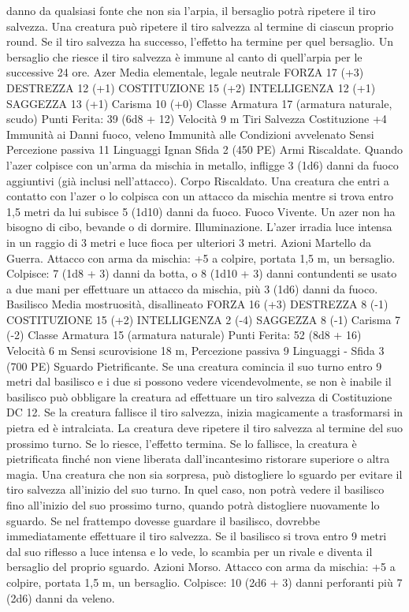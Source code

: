 \begin{multicols}{2}
danno da qualsiasi fonte che non sia l’arpia, il bersaglio potrà
ripetere il tiro salvezza. Una creatura può ripetere il tiro salvezza
al termine di ciascun proprio round. Se il tiro salvezza ha
successo, l’effetto ha termine per quel bersaglio.
Un bersaglio che riesce il tiro salvezza è immune al canto di
quell’arpia per le successive 24 ore.
Azer
Media elementale, legale neutrale
FORZA 17 (+3)
DESTREZZA 12 (+1)
COSTITUZIONE 15 (+2)
INTELLIGENZA 12 (+1)
SAGGEZZA 13 (+1)
Carisma 10 (+0)
Classe Armatura 17 (armatura naturale, scudo)
\hspace*{0pt}\hfill{Punti Ferita}: 39 (6d8 + 12)
Velocità 9 m
Tiri Salvezza Costituzione +4
Immunità ai Danni fuoco, veleno
Immunità alle Condizioni avvelenato
Sensi Percezione passiva 11
Linguaggi Ignan
Sfida 2 (450 PE)
Armi Riscaldate. Quando l’azer colpisce con un’arma da mischia
in metallo, infligge 3 (1d6) danni da fuoco aggiuntivi (già inclusi
nell’attacco).
Corpo Riscaldato. Una creatura che entri a contatto con l’azer o
lo colpisca con un attacco da mischia mentre si trova entro 1,5
metri da lui subisce 5 (1d10) danni da fuoco.
Fuoco Vivente. Un azer non ha bisogno di cibo, bevande o di
dormire.
Illuminazione. L’azer irradia luce intensa in un raggio di 3 metri
e luce fioca per ulteriori 3 metri.
Azioni
Martello da Guerra. Attacco con arma da mischia: +5 a colpire,
portata 1,5 m, un bersaglio.
Colpisce: 7 (1d8 + 3) danni da botta, o 8 (1d10 + 3) danni
contundenti se usato a due mani per effettuare un attacco da
mischia, più 3 (1d6) danni da fuoco.
Basilisco
Media mostruosità, disallineato
FORZA 16 (+3)
DESTREZZA 8 (-1)
COSTITUZIONE 15 (+2)
INTELLIGENZA 2 (-4)
SAGGEZZA 8 (-1)
Carisma 7 (-2)
Classe Armatura 15 (armatura naturale)
\hspace*{0pt}\hfill{Punti Ferita}: 52 (8d8 + 16)
Velocità 6 m
Sensi scurovisione 18 m, Percezione passiva 9
Linguaggi -
Sfida 3 (700 PE)
Sguardo Pietrificante. Se una creatura comincia il suo turno entro 9
metri dal basilisco e i due si possono vedere vicendevolmente, se non
è inabile il basilisco può obbligare la creatura ad effettuare un tiro
salvezza di Costituzione DC 12. Se la creatura fallisce il tiro
salvezza, inizia magicamente a trasformarsi in pietra ed è intralciata.
La creatura deve ripetere il tiro salvezza al termine del suo prossimo
turno. Se lo riesce, l’effetto termina. Se lo fallisce, la creatura è
pietrificata finché non viene liberata dall’incantesimo ristorare
superiore o altra magia.
Una creatura che non sia sorpresa, può distogliere lo sguardo per
evitare il tiro salvezza all’inizio del suo turno. In quel caso, non
potrà vedere il basilisco fino all’inizio del suo prossimo turno,
quando potrà distogliere nuovamente lo sguardo. Se nel
frattempo dovesse guardare il basilisco, dovrebbe
immediatamente effettuare il tiro salvezza.
Se il basilisco si trova entro 9 metri dal suo riflesso a luce intensa
e lo vede, lo scambia per un rivale e diventa il bersaglio del
proprio sguardo.
Azioni
Morso. Attacco con arma da mischia: +5 a colpire, portata 1,5
m, un bersaglio.
Colpisce: 10 (2d6 + 3) danni perforanti più 7 (2d6) danni da veleno.
 

\end{multicols}
